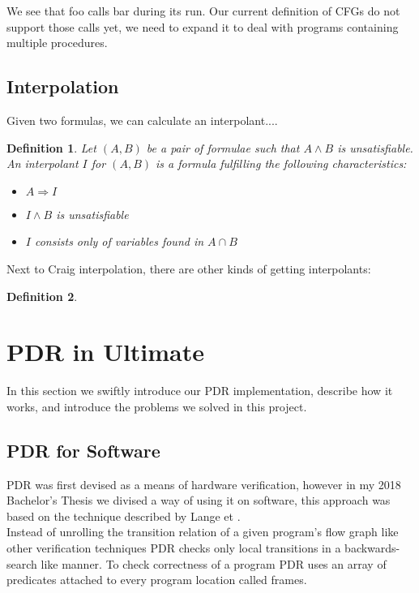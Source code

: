 \documentclass{article}
\newtheorem{mydef}{Definition}
\newcommand\mycom[1]{}
\newcommand\mycom[1]{#1}
\newcommand{\jw}[1]{\mycom{\todo[color=blue!40,inline]{\small JW: #1}}}
\begin{document}
	\jw{\textbf{@ToDo extend example by procedure call}} 
	We see that foo calls bar during its run. Our current definition of CFGs do not support those calls yet, we need to expand it to deal with programs containing multiple procedures.
	
	
	\pagebreak
		
	\subsection{Interpolation}
	Given two formulas, we can calculate an interpolant.... \jw{todo}
	
	\begin{mydef}
		Let $(A, B)$ be a pair of formulae such that $A \land B$ is unsatisfiable. An interpolant $I$ for $(A, B)$ is a formula fulfilling the following characteristics:
		\begin{itemize}
			\item $A \Rightarrow I$
			\item $I \land B$ is unsatisfiable
			\item $I$ consists only of variables found in $A \cap B$
		\end{itemize}
	\end{mydef}

	Next to Craig interpolation, there are other kinds of getting interpolants:
	\begin{mydef}
		\jw{Introduce Selfless interpolation}
	\end{mydef}
	\pagebreak
	
	\section{PDR in Ultimate}
	In this section we swiftly introduce our PDR implementation, describe how it works, and introduce the problems we solved in this project.
	
	\subsection{PDR for Software}
	PDR was first devised as a means of hardware verification, however in my 2018 Bachelor's Thesis we divised a way of using it on software, this approach was based on the technique described by Lange et \jw{Citation needed}. \\
	Instead of unrolling the transition relation of a given program's flow graph like other verification techniques PDR checks only local transitions in a backwards-search like manner.
	\smallskip
	To check correctness of a program PDR uses an array of predicates attached to every program location called frames. 
	
\end{document}
